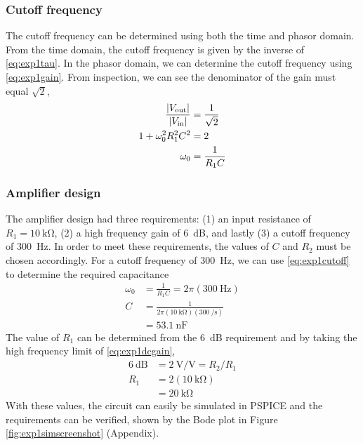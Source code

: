 \documentclass{report}
\begin{document}
	\subsubsection{Cutoff frequency}
	The cutoff frequency can be determined using both the time and phasor domain. From the time domain, the cutoff frequency is given by the inverse of \eqref{eq:exp1tau}. In the phasor domain, we can determine the cutoff frequency using \eqref{eq:exp1gain}. From inspection, we can see the denominator of the gain must equal $\sqrt{2}$, \begin{align}
		\frac{\abs{V_\mathrm{out}}}{\abs{V_\mathrm{in}}} & = \frac{1}{\sqrt{2}}  \notag \\
		1 + \omega_0^2 R_1^2 C^2 & = 2 \notag \\
		\omega_0 & = \frac{1}{R_1 C} \label{eq:exp1cutoff}
	\end{align}

	
	\subsubsection{Amplifier design}
	The amplifier design had three requirements: (1) an input resistance of $R_1 = \SI{10}{\kohm}$, (2) a high frequency gain of \SI{6}{\dB}, and lastly (3) a cutoff frequency of \SI{300}{\Hz}. In order to meet these requirements, the values of $C$ and $R_2$ must be chosen accordingly. For a cutoff frequency of \SI{300}{\Hz}, we can use \eqref{eq:exp1cutoff} to determine the required capacitance
	\begin{align*}
		\omega_0 & = \frac{1}{R_1 C} = 2 \pi \left( \SI{300}{\Hz}\right) \\
		C & = \frac{1}{2 \pi \left(\SI{10}{\kohm}\right)\left(\SI{300}{\per \second}\right)} \\
			& = \SI{53.1}{\nano\farad}
	\end{align*}
	The value of $R_1$ can be determined from the \SI{6}{\dB} requirement and by taking the high frequency limit of \eqref{eq:exp1dcgain}, \begin{align*}
		\SI{6}{\dB} & = \SI{2}{\V/\V} = R_2 / R_1\\
		R_1 & = 2 \left( \SI{10}{\kohm}\right) \\
			& = \SI{20}{\kohm}
	\end{align*}
	With these values, the circuit can easily be simulated in PSPICE and the requirements can be verified, shown by the Bode plot in Figure \ref{fig:exp1simscreenshot} (Appendix).
	
	\pagebreak
	
\end{document}
